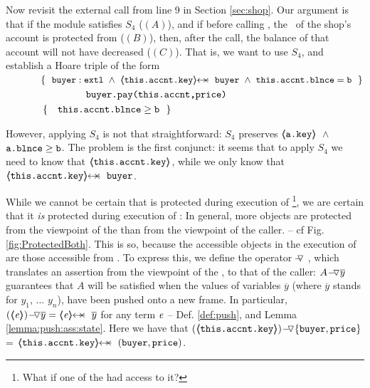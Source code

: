  Now  revisit the external call from line 9 in Section \ref{sec:shop}. Our argument is that if the module satisfies $S_4$ (\ie $(A)$), and if before calling , the \password\ of the shop's account is protected from  (\ie $(B)$), then, after the call, the balance of that account will not have decreased (\ie $(C)$). 
 That is, we want to use $S_4$, and   establish   a Hoare triple of the form
 \\
$\strut \ \ \ \ \ \ \ \ \ \ \  \{\  \ { \external{\prg{buyer}}} \ \wedge\ {\protectedFrom {\prg{this.\myAccount.key}} {\prg{buyer}}\ \wedge\ {\prg{this.\myAccount.\balance}}=\prg{b}    }\ \  \}$\\
$\strut \ \ \ \ \ \ \ \ \ \ \   \ \ \ \ \ \ \ \ \ \ \ \ {\ \prg{buyer.pay(this.accnt,price)}   \ } $\\
$\strut \ \ \ \ \ \ \ \ \ \ \  \{\  \ \  {\prg{this.\myAccount.\balance}} \geq  \prg{b} \  \  \}$ 

However, applying $S_4$ is not that straightforward: $S_4$ preserves   
${\inside {\prg{a.key}}}$\ $\wedge$\ $\prg{a.\balance}\geq\prg{b}$.
%
The problem is the first conjunct: it seems that to apply $S_4$ we need to know that ${\inside {\prg{this.\myAccount.key}}}$, while
we only know that $\protectedFrom {\prg{this.\myAccount.key}} {\prg{buyer}}$.%

 {While we cannot be certain that  
 {is  protected during execution of \footnote{{What if one of the  had access to it?}}, we are certain that it  \emph{is} protected during execution} of : 
{In general, more objects are protected from the viewpoint of the  than from the viewpoint of the caller. -- cf Fig.  \ref{fig:ProtectedBoth}.
This is so, because the   accessible objects in the execution of  are those accessible from .
To express this,} we define the operator $\pushSymbolAA$ , which   translates an assertion from the viewpoint of the , to that of the caller:
 $\PushAS y A$   guarantees that $A$ will be satisfied when the values of variables $\overline y$ (where $\overline y$ stands for $y_1$, ... $y_n$),  have been pushed onto a new frame. 
 In particular,   $\PushAS y {(\inside \re)} =  \protectedFrom \re {\overline {y} }$ for any term  $\re$ -- \cf 
 Def. \ref{def:push},  and Lemma \ref{lemma:push:ass:state}.
Here we have that 
 $\PushASLong {\{\prg{buyer},\prg{price}\}}  {(\inside {\prg{this.\myAccount.key}})}$
 =  $\protectedFrom {\prg{this.\myAccount.key}} {(\prg{buyer},\prg{price})}$.}


